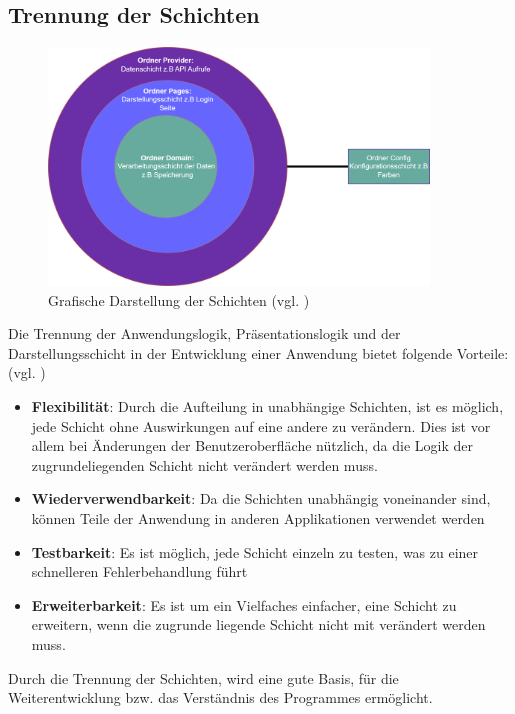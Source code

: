 \subsection{Trennung der Schichten }\label{subsec:seperationlayers}

\begin{figure}[h!]
\centering
\includegraphics[width=0.9\textwidth]{FLUTTER/images/GP/layers.png}
\caption{Grafische Darstellung der Schichten (vgl. \cite{flutter-layer})}
\end{figure}

Die Trennung der Anwendungslogik, Präsentationslogik und der Darstellungsschicht in der Entwicklung einer Anwendung bietet folgende Vorteile: (vgl. \cite{flutter-layer})
\begin{itemize}
    \item {\textbf{Flexibilität}}: Durch die Aufteilung in unabhängige Schichten, ist es möglich, jede Schicht ohne Auswirkungen auf eine andere zu verändern. Dies ist vor allem bei Änderungen der Benutzeroberfläche nützlich, da die Logik der zugrundeliegenden Schicht nicht verändert werden muss.
    \item {\textbf{Wiederverwendbarkeit}}: Da die Schichten unabhängig voneinander sind, können Teile der Anwendung in anderen Applikationen verwendet werden
    \item {\textbf{Testbarkeit}}: Es ist möglich, jede Schicht einzeln zu testen, was zu einer schnelleren Fehlerbehandlung führt
    \item {\textbf{Erweiterbarkeit}}: Es ist um ein Vielfaches einfacher, eine Schicht zu erweitern, wenn die zugrunde liegende Schicht nicht mit verändert werden muss.
\end{itemize}
Durch die Trennung der Schichten, wird eine gute Basis, für die Weiterentwicklung bzw. das Verständnis des Programmes ermöglicht.

